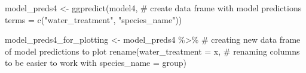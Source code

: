 \documentclass[
  letterpaper,
  DIV=11,
  numbers=noendperiod]{scrartcl}
\newenvironment{Shaded}{\begin{snugshade}}{\end{snugshade}}
\newcommand{\AttributeTok}[1]{\textcolor[rgb]{0.40,0.45,0.13}{#1}}
\newcommand{\CommentTok}[1]{\textcolor[rgb]{0.37,0.37,0.37}{#1}}
\newcommand{\FunctionTok}[1]{\textcolor[rgb]{0.28,0.35,0.67}{#1}}
\newcommand{\NormalTok}[1]{\textcolor[rgb]{0.00,0.23,0.31}{#1}}
\newcommand{\OtherTok}[1]{\textcolor[rgb]{0.00,0.23,0.31}{#1}}
\newcommand{\SpecialCharTok}[1]{\textcolor[rgb]{0.37,0.37,0.37}{#1}}
\newcommand{\StringTok}[1]{\textcolor[rgb]{0.13,0.47,0.30}{#1}}
\begin{document}
\begin{Shaded}
\begin{Highlighting}[]
\NormalTok{model\_preds4 }\OtherTok{\textless{}{-}} \FunctionTok{ggpredict}\NormalTok{(model4, }\CommentTok{\# create data frame with model predictions}
                         \AttributeTok{terms =} \FunctionTok{c}\NormalTok{(}\StringTok{"water\_treatment"}\NormalTok{, }
                                   \StringTok{"species\_name"}\NormalTok{))}

\NormalTok{model\_preds4\_for\_plotting }\OtherTok{\textless{}{-}}\NormalTok{ model\_preds4 }\SpecialCharTok{\%\textgreater{}\%} \CommentTok{\# creating new data frame of model predictions to plot}
  \FunctionTok{rename}\NormalTok{(}\AttributeTok{water\_treatment =}\NormalTok{ x, }\CommentTok{\# renaming columns to be easier to work with}
         \AttributeTok{species\_name =}\NormalTok{ group)}


\end{Highlighting}
\end{Shaded}
\end{document}
